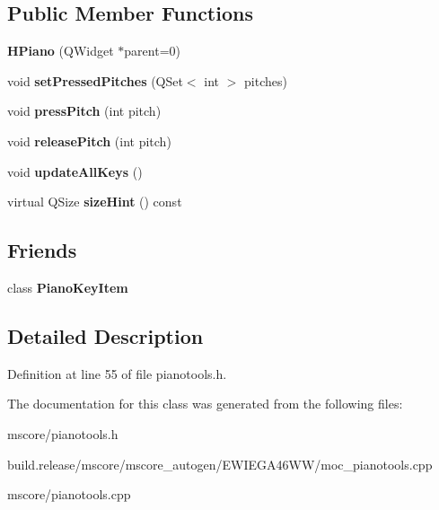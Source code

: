 \subsection*{Public Member Functions}
\begin{DoxyCompactItemize}
\item 
\mbox{\label{class_ms_1_1_h_piano_aa9f5ad756b4303715458eef7b42df119}} 
{\bfseries H\+Piano} (Q\+Widget $\ast$parent=0)
\item 
\mbox{\label{class_ms_1_1_h_piano_a4a35b7865a677ef6178466d824d6d5d4}} 
void {\bfseries set\+Pressed\+Pitches} (Q\+Set$<$ int $>$ pitches)
\item 
\mbox{\label{class_ms_1_1_h_piano_a46102f4230a8faeeaf17827fd2e7c15c}} 
void {\bfseries press\+Pitch} (int pitch)
\item 
\mbox{\label{class_ms_1_1_h_piano_a264779bd1f193f2ae621221b47e9ee2b}} 
void {\bfseries release\+Pitch} (int pitch)
\item 
\mbox{\label{class_ms_1_1_h_piano_a1bc52b0985aa2452179c647d2ab5eae0}} 
void {\bfseries update\+All\+Keys} ()
\item 
\mbox{\label{class_ms_1_1_h_piano_a6a3f45770ccbf80b42eb927b7b870c9b}} 
virtual Q\+Size {\bfseries size\+Hint} () const
\end{DoxyCompactItemize}
\subsection*{Friends}
\begin{DoxyCompactItemize}
\item 
\mbox{\label{class_ms_1_1_h_piano_a525a22cba724e5de82d22aad97c394d6}} 
class {\bfseries Piano\+Key\+Item}
\end{DoxyCompactItemize}


\subsection{Detailed Description}


Definition at line 55 of file pianotools.\+h.



The documentation for this class was generated from the following files\+:\begin{DoxyCompactItemize}
\item 
mscore/pianotools.\+h\item 
build.\+release/mscore/mscore\+\_\+autogen/\+E\+W\+I\+E\+G\+A46\+W\+W/moc\+\_\+pianotools.\+cpp\item 
mscore/pianotools.\+cpp\end{DoxyCompactItemize}
